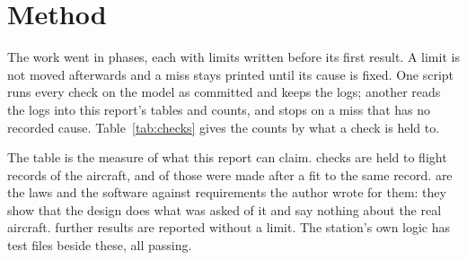 \documentclass[10pt,a4paper,twocolumn]{article}
\begin{document}
\section{Method}\label{sec:method}
The work went in phases, each with limits written before its first result. A limit is not moved afterwards and a miss stays printed until its cause is
fixed. One script runs every check on the model as committed and keeps the logs; another reads the logs into this report's tables and counts, and stops
on a miss that has no recorded cause. Table~\ref{tab:checks} gives the counts by what a check is held to.

\begin{table}[t]
\centering\small
\caption{All checks, pass/\textbf{miss}, by what they are held to: F a flight record of this aircraft, P a published figure or test, M another model or
another aircraft's data, D a design requirement of the author's, G generated (the model against the numbers it was generated from).}\label{tab:checks}

\end{table}

The table is the measure of what this report can claim. \NFpass{} checks are held to flight records of the aircraft, and \Nfitted{} of those were
made after a fit to the same record. \NDpass{} are the laws and the software against requirements the author wrote for them: they show that the
design does what was asked of it and say nothing about the real aircraft. \Nreported{} further results are reported without a limit. The station's
own logic has \Nstationtests{} test files beside these, all passing.
\end{document}
